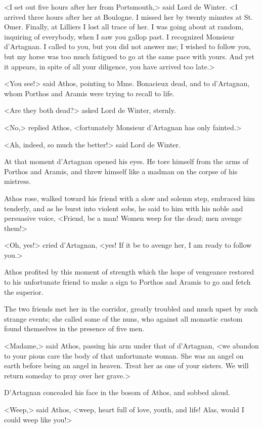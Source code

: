 <I set out five hours after her from Portsmouth,> said Lord de Winter. <I arrived three hours after her at Boulogne. I missed her by twenty minutes at St. Omer. Finally, at Lilliers I lost all trace of her. I was going about at random, inquiring of everybody, when I saw you gallop past. I recognized Monsieur d'Artagnan. I called to you, but you did not answer me; I wished to follow you, but my horse was too much fatigued to go at the same pace with yours. And yet it appears, in spite of all your diligence, you have arrived too late.> 

<You see!> said Athos, pointing to Mme. Bonacieux dead, and to d'Artagnan, whom Porthos and Aramis were trying to recall to life. 

<Are they both dead?> asked Lord de Winter, sternly. 

<No,> replied Athos, <fortunately Monsieur d'Artagnan has only fainted.> 

<Ah, indeed, so much the better!> said Lord de Winter. 

At that moment d'Artagnan opened his eyes. He tore himself from the arms of Porthos and Aramis, and threw himself like a madman on the corpse of his mistress. 

Athos rose, walked toward his friend with a slow and solemn step, embraced him tenderly, and as he burst into violent sobs, he said to him with his noble and persuasive voice, <Friend, be a man! Women weep for the dead; men avenge them!> 

<Oh, yes!> cried d'Artagnan, <yes! If it be to avenge her, I am ready to follow you.> 

Athos profited by this moment of strength which the hope of vengeance restored to his unfortunate friend to make a sign to Porthos and Aramis to go and fetch the superior. 

The two friends met her in the corridor, greatly troubled and much upset by such strange events; she called some of the nuns, who against all monastic custom found themselves in the presence of five men. 

<Madame,> said Athos, passing his arm under that of d'Artagnan, <we abandon to your pious care the body of that unfortunate woman. She was an angel on earth before being an angel in heaven. Treat her as one of your sisters. We will return someday to pray over her grave.> 

D'Artagnan concealed his face in the bosom of Athos, and sobbed aloud. 

<Weep,> said Athos, <weep, heart full of love, youth, and life! Alas, would I could weep like you!> 


